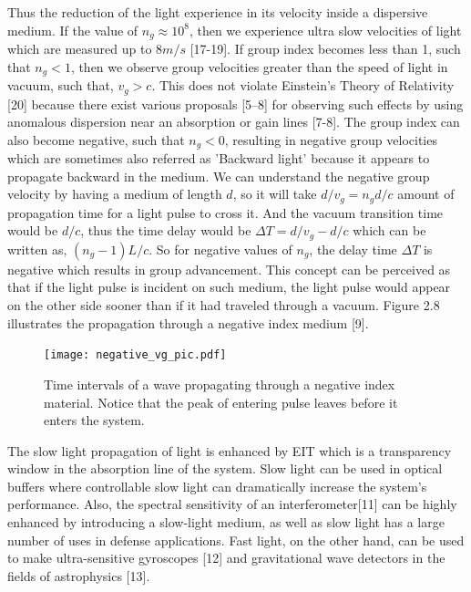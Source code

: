 Thus the reduction of the light experience in its velocity inside a dispersive medium. If the value of $n_{g} \approx 10^{8}$, then we experience ultra slow velocities of light which are measured up to $8m/s$ [17-19]. If group index becomes less than 1, such that $n_{g} < 1$, then we observe group velocities greater than the speed of light in vacuum, such that, $v_{g} > c$. This does not violate Einstein's Theory of Relativity [20] because there exist various proposals [5–8] for observing such effects by using anomalous dispersion near an absorption or gain lines [7-8]. The group index can also become negative, such that $n_{g} < 0$, resulting in negative group velocities which are sometimes also referred as 'Backward light' because it appears to propagate backward in the medium. We can understand the negative group velocity by having a medium of length $d$, so it will take $d/v_{g} = n_{g}d/c$ amount of propagation time for a light pulse to cross it. And the vacuum transition time would be $d/c$, thus the time delay would be $\Delta T = d/v_{g} - d/c$ which can be written as, $(n_{g}-1)L/c$. So for negative values of $n_{g}$, the delay time $\Delta T$ is negative which results in group advancement. This concept can be perceived as that if the light pulse is incident on such medium, the light pulse would appear on the other side sooner than if it had traveled through a vacuum. Figure 2.8 illustrates the propagation through a negative index medium [9]. 

\begin{figure}[h]
\centering
\texttt{[image: negative\_vg\_pic.pdf]}
\caption{Time intervals of a wave propagating through a negative index material. Notice that the peak of entering pulse leaves before it enters the system.}
\end{figure}

The slow light propagation of light is enhanced by EIT which is a transparency window in the absorption line of the system. Slow light can be used in optical buffers where controllable slow light can dramatically increase the system's performance. Also, the spectral sensitivity of an interferometer[11] can be highly enhanced by introducing a slow-light medium, as well as slow light has a large number of uses in defense applications. Fast light, on the other hand, can be used to make ultra-sensitive gyroscopes [12] and gravitational wave detectors in the fields of astrophysics [13].



